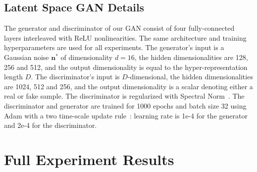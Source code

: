 \subsection{Latent Space GAN Details}
The generator and discriminator of our GAN consist of four fully-connected layers interleaved with ReLU nonlinearities. The same architecture and training hyperparameters are used for all experiments.
The generator's input is a Gaussian noise $\mathbf{n}^*$ of dimensionality $d=16$, the hidden dimensionalities are 128, 256 and 512, and the output dimensionality is equal to the hyper-representation length $D$.
The discriminator's input is $D$-dimensional, the hidden dimensionalities are 1024, 512 and 256, and the output dimensionality is a scalar denoting either a real or fake sample.
The discriminator is regularized with Spectral Norm~\cite{miyatoSpectralNormalizationGenerative2018}. The discriminator and generator are trained for 1000 epochs and batch size 32 using Adam with a two time-scale update rule~\cite{heusel2017gans}: learning rate is 1e-4 for the generator and 2e-4 for the discriminator.

\FloatBarrier
\newpage
\section{Full Experiment Results }
\label{app:results}

